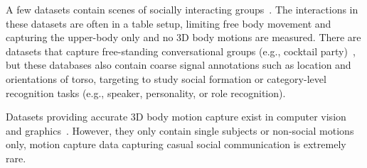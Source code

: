 A few datasets contain scenes of socially interacting groups~\cite{mccowan2005ami, zancanaro2006automatic, lepri2012connecting, rehg2013decoding}. The interactions in these datasets are often in a table setup, limiting free body movement and capturing the upper-body only and no 3D body motions are measured. There are datasets that capture free-standing conversational groups (e.g., cocktail party)~\cite{Zen-10, Cristani-11, alameda2016salsa, farenzena2009social}, but these databases also contain coarse signal annotations such as location and orientations of torso, targeting to study social formation or category-level recognition tasks (e.g., speaker, personality, or role recognition).

Datasets providing accurate 3D body motion capture exist in computer vision and graphics~\cite{gross2001cmu, h36m_pami, sigal2010humaneva}.  However, they only contain single subjects or non-social motions only, motion capture data capturing casual social communication is extremely rare. 

%





